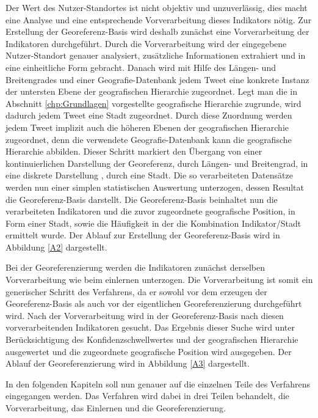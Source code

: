 	
	Der Wert des Nutzer-Standortes ist nicht objektiv und unzuverlässig, dies macht eine Analyse und eine entsprechende Vorverarbeitung dieses Indikators nötig.
	Zur Erstellung der Georeferenz-Basis wird deshalb zunächst eine Vorverarbeitung der Indikatoren durchgeführt.
	Durch die Vorverarbeitung wird der eingegebene Nutzer-Standort genauer analysiert, zusätzliche Informationen extrahiert und in eine einheitliche Form gebracht.
	Danach wird mit Hilfe des Längen- und Breitengrades und einer Geografie-Datenbank jedem Tweet eine konkrete Instanz der untersten Ebene der geografischen Hierarchie zugeordnet.
	Legt man die in Abschnitt \ref{chp:Grundlagen} vorgestellte geografische Hierarchie zugrunde, wird dadurch jedem Tweet eine Stadt zugeordnet.
	Durch diese Zuordnung werden jedem Tweet implizit auch die höheren Ebenen der geografischen Hierarchie zugeordnet, denn die verwendete Geografie-Datenbank kann die geografische Hierarchie abbilden.   	 
	Dieser Schritt markiert den Übergang von einer kontinuierlichen Darstellung der Georeferenz, durch Längen- und Breitengrad, in eine diskrete Darstellung , durch eine Stadt. 
	Die so verarbeiteten Datensätze werden nun einer simplen statistischen Auswertung unterzogen, dessen Resultat die Georeferenz-Basis darstellt.
	Die Georeferenz-Basis beinhaltet nun die verarbeiteten Indikatoren und die zuvor zugeordnete geografische Position, in Form einer Stadt, sowie die Häufigkeit in der die Kombination Indikator/Stadt ermittelt wurde.
	Der Ablauf zur Erstellung der Georeferenz-Basis wird in Abbildung \ref{A2} dargestellt.

	Bei der Georeferenzierung werden die Indikatoren zunächst derselben Vorverarbeitung wie beim einlernen unterzogen.
	Die Vorverarbeitung ist somit ein generischer Schritt des Verfahrens, da er sowohl vor dem erzeugen der Georeferenz-Basis als auch vor der eigentlichen Georeferenzierung durchgeführt wird.
	Nach der Vorverarbeitung wird in der Georeferenz-Basis nach diesen vorverarbeitenden Indikatoren gesucht.
	Das Ergebnis dieser Suche wird unter Berücksichtigung des Konfidenzschwellwertes und der geografischen Hierarchie ausgewertet und die zugeordnete geografische Position wird ausgegeben.  
	Der Ablauf der Georeferenzierung wird in Abbildung \ref{A3} dargestellt. 


	In den folgenden Kapiteln soll nun genauer auf die einzelnen Teile des Verfahrens eingegangen werden. 
	Das Verfahren wird dabei in drei Teilen behandelt, die Vorverarbeitung, das Einlernen und die Georeferenzierung.

